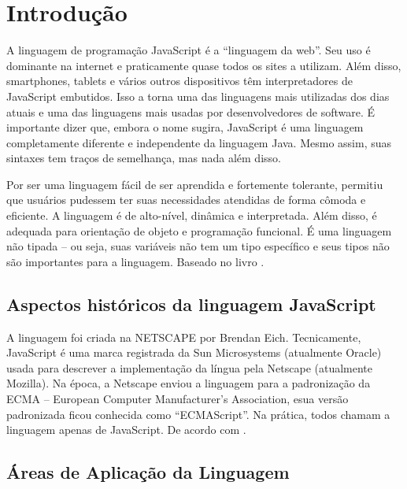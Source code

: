 



\chapter{ Introdu\c{c}\~{a}o}

A linguagem de programação JavaScript é a “linguagem da web”. Seu uso é dominante na internet e praticamente quase todos os sites a utilizam. 
Além disso, smartphones, tablets e vários outros dispositivos têm interpretadores de JavaScript embutidos. 
Isso a torna uma das linguagens mais utilizadas dos dias atuais e uma das linguagens mais usadas por desenvolvedores de software. 
É importante dizer que, embora o nome sugira, JavaScript é uma linguagem completamente diferente e independente da linguagem Java. 
Mesmo assim, suas sintaxes tem traços de semelhança, mas nada além disso. \newline

Por ser uma linguagem fácil de ser aprendida e fortemente tolerante, permitiu que usuários pudessem ter suas necessidades 
atendidas de forma cômoda e eficiente.
 A linguagem é de alto-nível, dinâmica e interpretada. Além disso, é adequada para orientação de objeto e programação funcional. 
 É uma linguagem não tipada – ou seja, suas variáveis não tem um tipo específico e seus tipos não são importantes para a linguagem. 
Baseado no livro \cite{flanagan2020javascript}.

\section{Aspectos hist\'{o}ricos da linguagem JavaScript}
   
A linguagem foi criada na NETSCAPE por Brendan Eich. Tecnicamente, JavaScript é uma marca registrada da Sun Microsystems (atualmente Oracle) usada para descrever a implementação da língua pela Netscape (atualmente Mozilla). Na época, a Netscape enviou a linguagem para a padronização da ECMA – European Computer Manufacturer’s Association, esua versão padronizada ficou conhecida como “ECMAScript”. Na prática, todos chamam a linguagem apenas de JavaScript.
De acordo com \cite{flanagan2020javascript}.



   \section{\'{A}reas de Aplica\c{c}\~{a}o da Linguagem}

